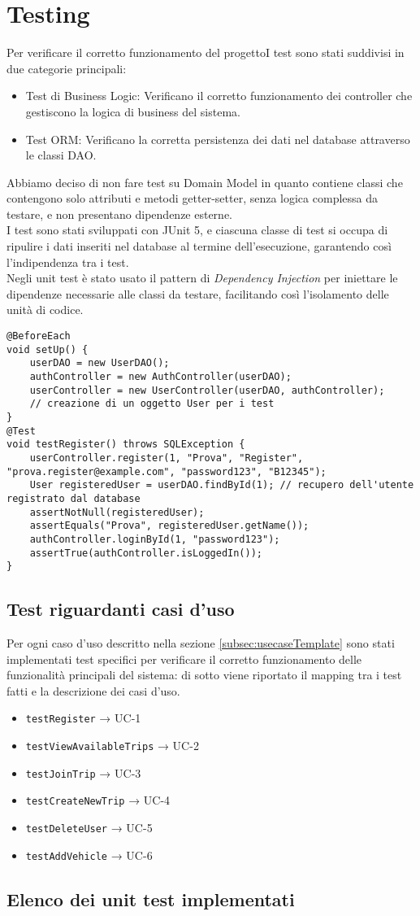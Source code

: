 \section{Testing}

Per verificare il corretto funzionamento del progettoI test sono stati suddivisi in due categorie principali:
\begin{itemize}
    \item Test di Business Logic: Verificano il corretto funzionamento dei controller che gestiscono la logica di business del sistema.
    \item Test ORM: Verificano la corretta persistenza dei dati nel database attraverso le classi DAO.
\end{itemize}
Abbiamo deciso di non fare test su Domain Model in quanto contiene classi che contengono solo attributi e metodi getter-setter, senza logica complessa da testare, e non presentano dipendenze esterne.\\
I test sono stati sviluppati con JUnit 5, e ciascuna classe di test si occupa di ripulire i dati inseriti nel database al termine dell'esecuzione, garantendo così l'indipendenza tra i test.\\
Negli unit test è stato usato il pattern di \textit{Dependency Injection} per iniettare le dipendenze necessarie alle classi da testare, facilitando così l'isolamento delle unità di codice.\\
\begin{lstlisting}[style=java, caption={Esempio di Dependency Injection in UserControllerTest}]
@BeforeEach
void setUp() {
    userDAO = new UserDAO();
    authController = new AuthController(userDAO);
    userController = new UserController(userDAO, authController);
    // creazione di un oggetto User per i test
}
@Test
void testRegister() throws SQLException {
    userController.register(1, "Prova", "Register", "prova.register@example.com", "password123", "B12345");
    User registeredUser = userDAO.findById(1); // recupero dell'utente registrato dal database
    assertNotNull(registeredUser);
    assertEquals("Prova", registeredUser.getName());
    authController.loginById(1, "password123");
    assertTrue(authController.isLoggedIn());
}
\end{lstlisting}
\subsection{Test riguardanti casi d'uso}
Per ogni caso d'uso descritto nella sezione \ref{subsec:usecaseTemplate} sono stati implementati test specifici per verificare il corretto funzionamento delle funzionalità principali del sistema: di sotto viene riportato il mapping tra i test fatti e la descrizione dei casi d'uso.
\begin{itemize}
    \item \texttt{testRegister} → UC-1
    \item \texttt{testViewAvailableTrips} → UC-2
    \item \texttt{testJoinTrip} → UC-3
    \item \texttt{testCreateNewTrip} → UC-4
    \item \texttt{testDeleteUser} → UC-5
    \item \texttt{testAddVehicle} → UC-6
\end{itemize}
\subsection{Elenco dei unit test implementati}


